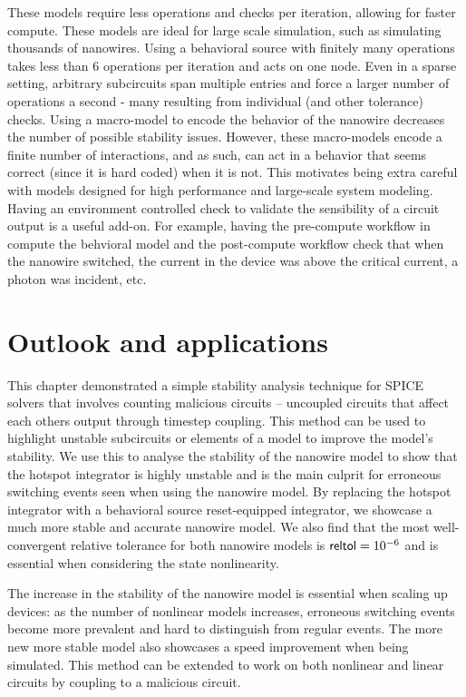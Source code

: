 These models require less operations and checks per iteration, allowing for faster compute. 
These models are ideal for large scale simulation, such as simulating thousands of nanowires.
Using
a behavioral source with finitely many operations takes less than 6 operations per iteration and
acts on one node. Even in a sparse setting, arbitrary subcircuits span multiple entries and force
a larger number of operations a second - many resulting from individual  (and other tolerance)
checks. Using a macro-model to encode the behavior of the nanowire decreases the number of possible
stability issues. However, these macro-models encode a finite number of interactions, and as such, can 
act in a behavior that seems correct (since it is hard coded) when it is not. This motivates being
extra careful with models designed for high performance and large-scale system modeling. Having an
environment controlled check to validate the sensibility of a circuit output is a useful add-on. For
example, having the pre-compute workflow in  compute the behvioral model and the
post-compute workflow check that when the nanowire switched, the current in the device was above
the critical current, a photon was incident, etc. 

\section{Outlook and applications}

This chapter demonstrated a simple stability analysis technique for SPICE solvers that involves
counting malicious circuits --  uncoupled circuits that affect each others output through
timestep coupling. This method can be used to highlight unstable subcircuits or elements of a 
model to improve the model's stability. We use this to analyse the stability of the nanowire 
model to show that the hotspot integrator is highly unstable and is the main culprit for
erroneous switching events seen when using the nanowire model. By replacing the hotspot 
integrator with a behavioral source reset-equipped integrator, we showcase a much more stable
and accurate nanowire model. We also find that the most well-convergent relative tolerance 
for both nanowire models is $\textnormal{\textsf{reltol}}=10^{-6}$ and is essential when considering the
state nonlinearity.

The increase in the stability of the nanowire model is essential when scaling up devices: 
as the number of nonlinear models increases, erroneous switching events become more prevalent
and hard to distinguish from regular events. The more new more stable model also showcases a
speed improvement when being simulated. This method can be extended to work on both nonlinear
and linear circuits by coupling to a malicious circuit.